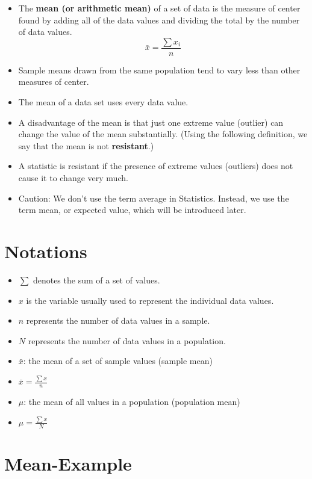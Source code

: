 \documentclass[]{book}
\providecommand{\tightlist}{%
  \setlength{\itemsep}{0pt}\setlength{\parskip}{0pt}}
\begin{document}
\begin{itemize}
\tightlist
\item
  The \textbf{mean (or arithmetic mean)} of a set of data is the measure of center found by adding all of the data values and dividing the total by the number of data values.
  \[\bar{x}=\frac{\sum x_i}{n}\]
\item
  Sample means drawn from the same population tend to vary less than other measures of center.
\item
  The mean of a data set uses every data value.
\item
  A disadvantage of the mean is that just one extreme value (outlier) can change the value of the mean substantially. (Using the following definition, we say that the mean is not \textbf{resistant}.)
\item
  A statistic is resistant if the presence of extreme values (outliers) does not cause it to change very much.
\item
  Caution: We don't use the term average in Statistics. Instead, we use the term mean, or expected value, which will be introduced later.
\end{itemize}

\hypertarget{notations}{%
\section{Notations}\label{notations}}

\begin{itemize}
\tightlist
\item
  \(\sum\) denotes the sum of a set of values.
\item
  \(x\) is the variable usually used to represent the individual data values.
\item
  \(n\) represents the number of data values in a sample.
\item
  \(N\) represents the number of data values in a population.
\item
  \(\bar{x}\): the mean of a set of sample values (sample mean)
\item
  \(\bar{x}=\frac{\sum{x}}{n}\)
\item
  \(\mu\): the mean of all values in a population (population mean)
\item
  \(\mu=\frac{\sum{x}}{N}\)
\end{itemize}

\hypertarget{mean-example}{%
\section{Mean-Example}\label{mean-example}}
\end{document}
